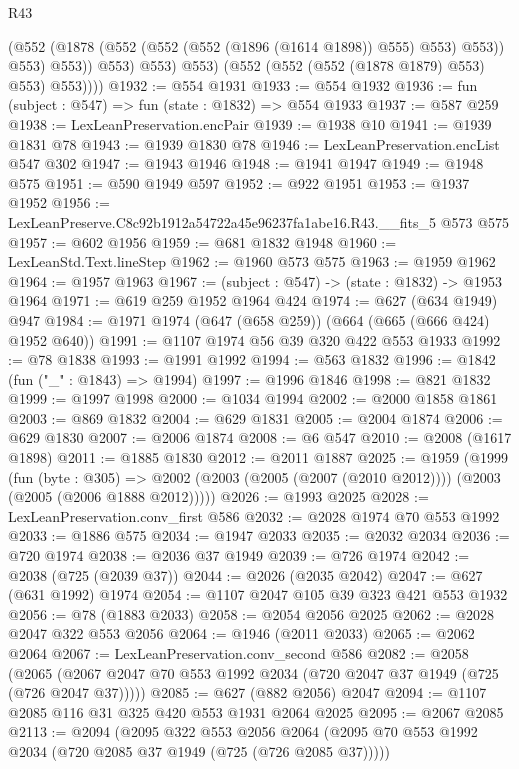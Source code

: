\begin{lexlean}{R43}
\begin{coremodule}
                    (@552 (@1878 (@552 (@552 (@552 (@1896 (@1614 @1898)) @555) @553) @553)) @553)
                    @553))
                @553)
              @553)
            @553)
          (@552 (@552 (@552 (@1878 @1879) @553) @553) @553))))
@1932 := @554 @1931
@1933 := @554 @1932
@1936 := fun (subject : @547) => fun (state : @1832) => @554 @1933
@1937 := @587 @259
@1938 := LexLeanPreservation.encPair
@1939 := @1938 @10
@1941 := @1939 @1831 @78
@1943 := @1939 @1830 @78
@1946 := LexLeanPreservation.encList @547 @302
@1947 := @1943 @1946
@1948 := @1941 @1947
@1949 := @1948 @575
@1951 := @590 @1949 @597
@1952 := @922 @1951
@1953 := @1937 @1952
@1956 := LexLeanPreserve.C8c92b1912a54722a45e96237fa1abe16.R43.__fits_5 @573 @575
@1957 := @602 @1956
@1959 := @681 @1832 @1948
@1960 := LexLeanStd.Text.lineStep
@1962 := @1960 @573 @575
@1963 := @1959 @1962
@1964 := @1957 @1963
@1967 := (subject : @547) -> (state : @1832) -> @1953 @1964
@1971 := @619 @259 @1952 @1964 @424
@1974 := @627 (@634 @1949) @947
@1984 := @1971 @1974 (@647 (@658 @259)) (@664 (@665 (@666 @424) @1952 @640))
@1991 := @1107 @1974 @56 @39 @320 @422 @553 @1933
@1992 := @78 @1838
@1993 := @1991 @1992
@1994 := @563 @1832
@1996 := @1842 (fun ("_" : @1843) => @1994)
@1997 := @1996 @1846
@1998 := @821 @1832
@1999 := @1997 @1998
@2000 := @1034 @1994
@2002 := @2000 @1858 @1861
@2003 := @869 @1832
@2004 := @629 @1831
@2005 := @2004 @1874
@2006 := @629 @1830
@2007 := @2006 @1874
@2008 := @6 @547
@2010 := @2008 (@1617 @1898)
@2011 := @1885 @1830
@2012 := @2011 @1887
@2025 := @1959
    (@1999
      (fun (byte : @305) =>
      @2002 (@2003 (@2005 (@2007 (@2010 @2012)))) (@2003 (@2005 (@2006 @1888 @2012)))))
@2026 := @1993 @2025
@2028 := LexLeanPreservation.conv_first @586
@2032 := @2028 @1974 @70 @553 @1992
@2033 := @1886 @575
@2034 := @1947 @2033
@2035 := @2032 @2034
@2036 := @720 @1974
@2038 := @2036 @37 @1949
@2039 := @726 @1974
@2042 := @2038 (@725 (@2039 @37))
@2044 := @2026 (@2035 @2042)
@2047 := @627 (@631 @1992) @1974
@2054 := @1107 @2047 @105 @39 @323 @421 @553 @1932
@2056 := @78 (@1883 @2033)
@2058 := @2054 @2056 @2025
@2062 := @2028 @2047 @322 @553 @2056
@2064 := @1946 (@2011 @2033)
@2065 := @2062 @2064
@2067 := LexLeanPreservation.conv_second @586
@2082 := @2058
    (@2065 (@2067 @2047 @70 @553 @1992 @2034 (@720 @2047 @37 @1949 (@725 (@726 @2047 @37)))))
@2085 := @627 (@882 @2056) @2047
@2094 := @1107 @2085 @116 @31 @325 @420 @553 @1931 @2064 @2025
@2095 := @2067 @2085
@2113 := @2094
    (@2095
      @322
      @553
      @2056
      @2064
      (@2095 @70 @553 @1992 @2034 (@720 @2085 @37 @1949 (@725 (@726 @2085 @37)))))

\end{coremodule}
\end{lexlean}
